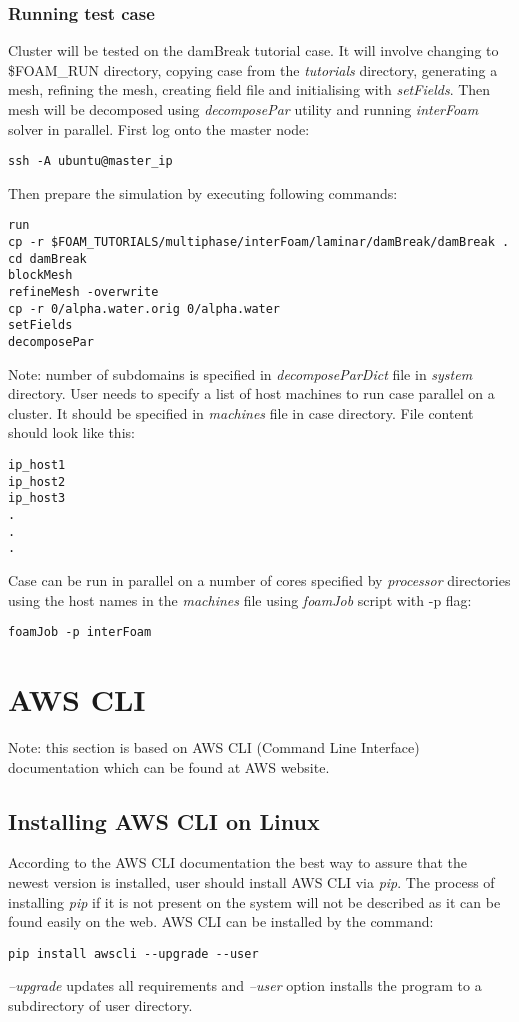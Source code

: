 \documentclass[12pt,english]{article}
\begin{document}
\subsubsection{Running test case}
Cluster will be tested on the damBreak tutorial case. It will involve changing to \$FOAM\_RUN directory, copying case from the \textit{tutorials} directory, generating a mesh, refining the mesh, creating field file and initialising with \textit{setFields}. Then mesh will be decomposed using \textit{decomposePar} utility and running \textit{interFoam} solver in parallel.
First log onto the master node:
\begin{lstlisting}
ssh -A ubuntu@master_ip
\end{lstlisting}
Then prepare the simulation by executing following commands:
\begin{lstlisting}
run
cp -r $FOAM_TUTORIALS/multiphase/interFoam/laminar/damBreak/damBreak .
cd damBreak
blockMesh
refineMesh -overwrite
cp -r 0/alpha.water.orig 0/alpha.water
setFields
decomposePar
\end{lstlisting}
Note: number of subdomains is specified in \textit{decomposeParDict} file in \textit{system} directory.
User needs to specify a list of host machines to run case parallel on a cluster. It should be specified in \textit{machines} file in case directory. File content should look like this:
\begin{lstlisting}
ip_host1
ip_host2
ip_host3
.
.
.
\end{lstlisting}
Case can be run in parallel on a number of cores specified by \textit{processor} directories using the host names in the \textit{machines} file using \textit{foamJob} script with -p flag:
\begin{lstlisting}
foamJob -p interFoam
\end{lstlisting}

\section{AWS CLI}
Note: this section is based on AWS CLI (Command Line Interface) documentation which can be found at AWS website.
\subsection{\label{Install AWS CLI}Installing AWS CLI on Linux}
According to the AWS CLI documentation the best way to assure that the newest version is installed, user should install AWS CLI via \textit{pip}. The process of installing \textit{pip} if it is not present on the system will not be described as it can be found easily on the web.
AWS CLI can be installed by the command:
\begin{lstlisting}	
pip install awscli --upgrade --user
\end{lstlisting}
\textit{--upgrade} updates all requirements and \textit{--user} option installs the program to a subdirectory of user directory.
\end{document}
